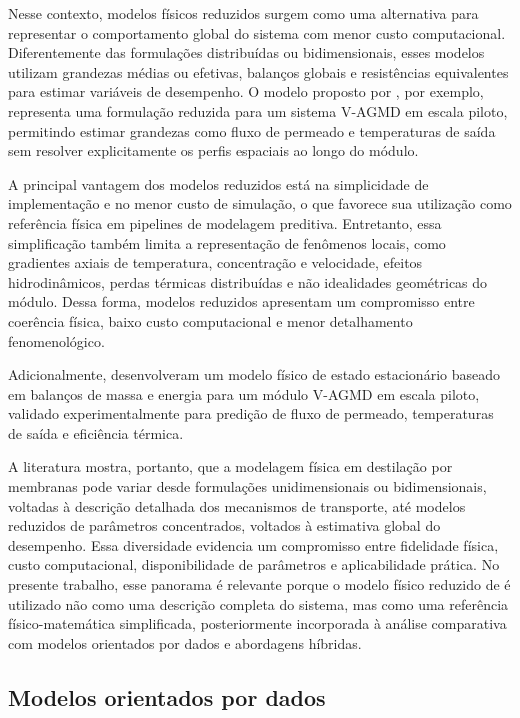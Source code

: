 Nesse contexto, modelos físicos reduzidos surgem como uma alternativa para representar o comportamento global do sistema com menor custo computacional. Diferentemente das formulações distribuídas ou bidimensionais, esses modelos utilizam grandezas médias ou efetivas, balanços globais e resistências equivalentes para estimar variáveis de desempenho. O modelo proposto por \cite{Lisboa2024}, por exemplo, representa uma formulação reduzida para um sistema V-AGMD em escala piloto, permitindo estimar grandezas como fluxo de permeado e temperaturas de saída sem resolver explicitamente os perfis espaciais ao longo do módulo.

A principal vantagem dos modelos reduzidos está na simplicidade de implementação e no menor custo de simulação, o que favorece sua utilização como referência física em pipelines de modelagem preditiva. Entretanto, essa simplificação também limita a representação de fenômenos locais, como gradientes axiais de temperatura, concentração e velocidade, efeitos hidrodinâmicos, perdas térmicas distribuídas e não idealidades geométricas do módulo. Dessa forma, modelos reduzidos apresentam um compromisso entre coerência física, baixo custo computacional e menor detalhamento fenomenológico.

Adicionalmente, \cite{AndresManas2023} desenvolveram um modelo físico de estado estacionário baseado em balanços de massa e energia para um módulo V-AGMD em escala piloto, validado experimentalmente para predição de fluxo de permeado, temperaturas de saída e eficiência térmica.

A literatura mostra, portanto, que a modelagem física em destilação por membranas pode variar desde formulações unidimensionais ou bidimensionais, voltadas à descrição detalhada dos mecanismos de transporte, até modelos reduzidos de parâmetros concentrados, voltados à estimativa global do desempenho. Essa diversidade evidencia um compromisso entre fidelidade física, custo computacional, disponibilidade de parâmetros e aplicabilidade prática. No presente trabalho, esse panorama é relevante porque o modelo físico reduzido de \cite{Lisboa2024} é utilizado não como uma descrição completa do sistema, mas como uma referência físico-matemática simplificada, posteriormente incorporada à análise comparativa com modelos orientados por dados e abordagens híbridas.
\subsection{Modelos orientados por dados}

